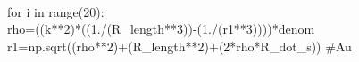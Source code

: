 \documentclass[letterpaper,12pt]{article}
\begin{document}
\\for i in range(20):
  \\  rho=((k**2)*((1./(R_length**3))-(1./(r1**3))))*denom
    \\r1=np.sqrt((rho**2)+(R_length**2)+(2*rho*R_dot_s)) #Au
    
    
    
 

\end{document}
